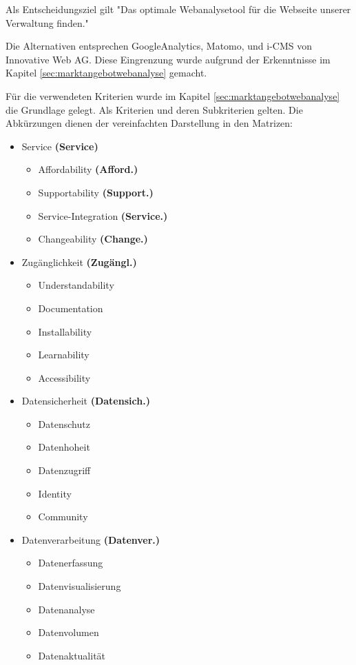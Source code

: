 Als Entscheidungsziel gilt "Das optimale Webanalysetool für die Webseite unserer Verwaltung finden."

Die Alternativen entsprechen GoogleAnalytics, Matomo, und i-CMS von Innovative Web AG. Diese Eingrenzung wurde aufgrund der Erkenntnisse im Kapitel \ref{sec:marktangebotwebanalyse} gemacht. 

\newpage
Für die verwendeten Kriterien wurde im Kapitel \ref{sec:marktangebotwebanalyse} die Grundlage gelegt. Als Kriterien und deren Subkriterien gelten. Die Abkürzungen dienen der vereinfachten Darstellung in den Matrizen:

\begin{itemize}
  \item Service \textbf{(Service)} \begin{itemize}
    \item Affordability  \textbf{(Afford.)}
    \item Supportability \textbf{(Support.)}
    \item Service-Integration \textbf{(Service.)}
    \item Changeability \textbf{(Change.)}
  \end{itemize}
  \item Zugänglichkeit \textbf{(Zugängl.)} \begin{itemize}
    \item Understandability
    \item Documentation
    \item Installability
    \item Learnability
    \item Accessibility
  \end{itemize}
  \item Datensicherheit \textbf{(Datensich.)} \begin{itemize}
    \item Datenschutz
    \item Datenhoheit
    \item Datenzugriff
    \item Identity
    \item Community
  \end{itemize}
  \item Datenverarbeitung \textbf{(Datenver.)} \begin{itemize}
    \item Datenerfassung
    \item Datenvisualisierung
    \item Datenanalyse
    \item Datenvolumen
    \item Datenaktualität
  \end{itemize}
\end{itemize}
\newpage


